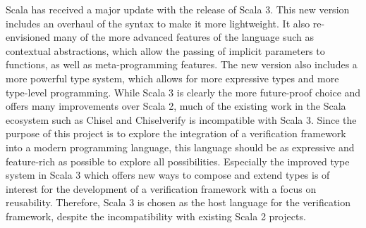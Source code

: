 Scala has received a major update with the release of Scala 3. This new version includes an overhaul of the syntax to
make it more lightweight. It also re-envisioned many of the more advanced features of the language such as contextual
abstractions, which allow the passing of implicit parameters to functions, as well as meta-programming features. The
new version also includes a more powerful type system, which allows for more expressive types and more type-level
programming. While Scala 3 is clearly the more future-proof choice and offers many improvements over Scala 2, much of
the existing work in the Scala ecosystem such as Chisel and Chiselverify is incompatible with Scala 3. Since the
purpose of this project is to explore the integration of a verification framework into a modern programming language,
this language should be as expressive and feature-rich as possible to explore all possibilities. Especially
the improved type system in Scala 3 which offers new ways to compose and extend types is of interest for the
development of a verification framework with a focus on reusability. Therefore, Scala 3 is chosen as the host
language for the verification framework, despite the incompatibility with existing Scala 2 projects.

